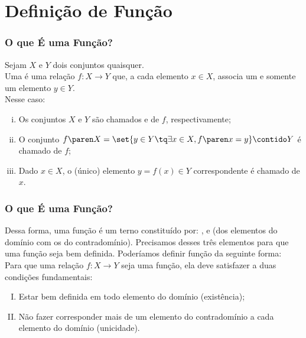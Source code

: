 \documentclass[10pt]{beamer}
\begin{document}
\section{Definição de Função}
\begin{frame} \frametitle{O que É uma Função?}
\begin{definicao}
Sejam $X$ e $Y$ dois conjuntos quaisquer.\\
Uma  é uma relação $f: X \to Y$ que, a cada elemento $x
\in X$, associa um e somente um elemento $y \in Y$.\\
Nesse caso:
\begin{enumerate}[(i)]
	\item Os conjuntos $X$ e $Y$ são chamados  e
	 de $f$, respectivamente;
	\item O conjunto $f\paren X = \set{y \in Y \tq \exists x \in X , f \paren x =
	y} \contido Y$ é chamado  de $f$;
	\item Dado $x \in X$, o (único) elemento $y = f(x) \in Y$
	correspondente é chamado  de $x$.
\end{enumerate}
\end{definicao}

\end{frame}


\begin{frame} \frametitle{O que É uma Função?} 

Dessa forma, uma função é um terno constituído por: ,
 e  (dos elementos do
domínio com os do contradomínio). Precisamos desses três elementos
para que uma função seja bem definida. Poderíamos definir
função da seguinte forma: \\
Para que uma relação $f: X \to Y$ seja
uma função, ela deve satisfazer a duas condições fundamentais:
\begin{enumerate}[(I)]
	\item Estar bem definida em todo elemento do domínio (existência);
	\item Não fazer corresponder mais de um elemento do contradomínio
	a cada elemento do domínio (unicidade).
\end{enumerate}

\end{frame}

\end{document}
